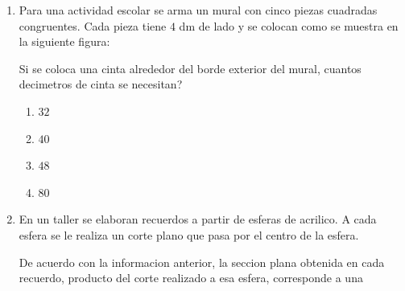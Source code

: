 \documentclass[12pt]{article}
\begin{document}
\begin{enumerate}[label=\textbf{\arabic*.}, itemsep=1.1cm]
De acuerdo con la informacion anterior, la superficie de esa pieza decorativa, en metros cuadrados, es mayor que

\begin{enumerate}[label=\Alph*)]
  \item $22$ y menor que $23$.
  \item $18$ y menor que $20$.
  \item $16$ y menor que $18$.
  \item $24$ y menor que $26$.
\end{enumerate}

\Needspace{0.88\textheight}
\item
Para una actividad escolar se arma un mural con cinco piezas cuadradas congruentes. Cada pieza tiene $4$ dm de lado y se colocan como se muestra en la siguiente figura:

\begin{center}
\end{center}

Si se coloca una cinta alrededor del borde exterior del mural, \textquestiondown cuantos decimetros de cinta se necesitan?

\begin{enumerate}[label=\Alph*)]
  \item $32$
  \item $40$
  \item $48$
  \item $80$
\end{enumerate}

\Needspace{0.42\textheight}
\item
En un taller se elaboran recuerdos a partir de esferas de acrilico. A cada esfera se le realiza un corte plano que pasa por el centro de la esfera.

De acuerdo con la informacion anterior, la seccion plana obtenida en cada recuerdo, producto del corte realizado a esa esfera, corresponde a una


\end{enumerate}
\end{document}
